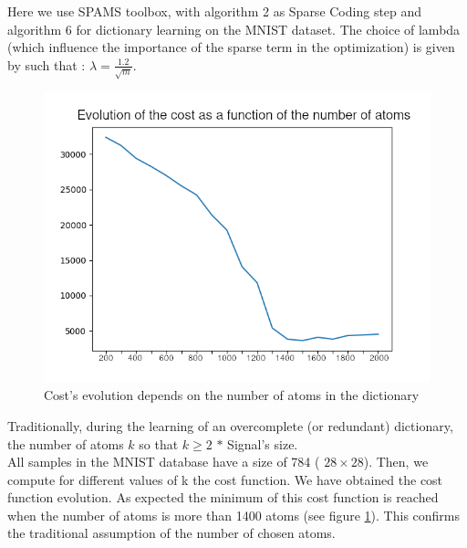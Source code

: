 Here we use SPAMS toolbox, with algorithm 2 as Sparse Coding step and algorithm 6 for dictionary learning on the MNIST dataset. The choice of lambda (which influence the importance of the sparse term in the optimization) is given by  \cite{Mairal:2009:ODL:1553374.1553463} such that : $\lambda = \frac{1.2}{\sqrt{m}}$. \\
\begin{figure}[h]
 \centering
 \includegraphics[scale=0.6]{Cost.png}
 \caption{Cost's evolution depends on the number of atoms in the dictionary}
 \label{fig:CostEvolution}
\end{figure}
\vspace{0.2cm}
Traditionally, during the learning of an overcomplete (or redundant) dictionary, the number of atoms $k$ so that $k \geq 2$ $*$ Signal's size.\\
All samples in the MNIST database have a size of 784 ( $28  \times 28$). Then, we compute for different values of k the cost function. We have obtained the cost function evolution. As expected the minimum of this cost function is reached when the number of atoms is more than 1400 atoms (see figure \ref{fig:CostEvolution}). This confirms the traditional assumption of the number of chosen atoms.
